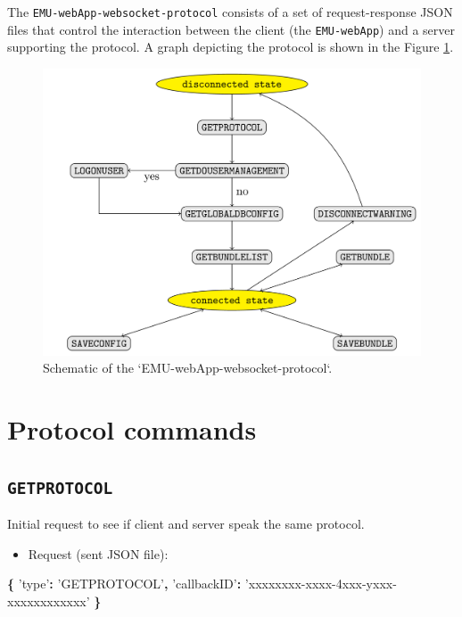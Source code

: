 \documentclass[]{book}
\newenvironment{Shaded}{\begin{snugshade}}{\end{snugshade}}
\newcommand{\OperatorTok}[1]{\textcolor[rgb]{0.81,0.36,0.00}{\textbf{#1}}}
\newcommand{\StringTok}[1]{\textcolor[rgb]{0.31,0.60,0.02}{#1}}
\providecommand{\tightlist}{%
  \setlength{\itemsep}{0pt}\setlength{\parskip}{0pt}}
\begin{document}
The \texttt{EMU-webApp-websocket-protocol} consists of a set of request-response JSON files that control the interaction between the client (the \texttt{EMU-webApp}) and a server supporting the protocol. A graph depicting the protocol is shown in the Figure \ref{fig:app-chapWsProtocolGraph}.

\begin{figure}

{\centering \includegraphics[width=0.75\linewidth]{pics/protocol} 

}

\caption{Schematic of the `EMU-webApp-websocket-protocol`.}\label{fig:app-chapWsProtocolGraph}
\end{figure}

\hypertarget{protocol-commands}{%
\section{Protocol commands}\label{protocol-commands}}

\hypertarget{getprotocol}{%
\subsection{\texorpdfstring{\texttt{GETPROTOCOL}}{GETPROTOCOL}}\label{getprotocol}}

Initial request to see if client and server speak the same protocol.

\begin{itemize}
\tightlist
\item
  Request (sent JSON file):
\end{itemize}

\begin{Shaded}
\begin{Highlighting}[]
\OperatorTok{\{}
  \StringTok{'type'}\OperatorTok{:} \StringTok{'GETPROTOCOL'}\OperatorTok{,}
  \StringTok{'callbackID'}\OperatorTok{:} \StringTok{'xxxxxxxx-xxxx-4xxx-yxxx-xxxxxxxxxxxx'}
\OperatorTok{\}}
\end{Highlighting}
\end{Shaded}
\end{document}

